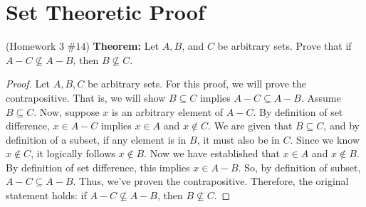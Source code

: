 \documentclass[12pt]{amsart}
\begin{document}
\section{Set Theoretic Proof}
{(Homework 3 $\#14$) }
\textbf{Theorem:}{ Let $A, B$, and $C$ be arbitrary sets. Prove that if $A-C \nsubseteq A-B$, then $B \nsubseteq C$.}
\begin{proof}
Let $A, B, C$ be arbitrary sets. For this proof, we will prove the contrapositive. That is, we will show $B \subseteq C$ implies $A-C \subseteq A-B$. Assume $B \subseteq C$. Now, suppose $x$ is an arbitrary element of $A - C$. By definition of set difference, $x \in A - C$ implies $x \in A$ and $x \not \in C$. We are given that $B \subseteq C$, and by definition of a subset, if any element is in $B$, it must also be in $C$. Since we know $x \notin C$, it logically follows $x \notin B$.
Now we have established that $x \in A$ and $x \notin B$. By definition of set difference, this implies $x \in A - B$. So, by definition of subset, $A - C \subseteq A - B$. Thus, we've proven the contrapositive. Therefore, the original statement holds: if $A - C \not\subseteq A - B$, then $ B \not\subseteq C$.
\end{proof}
\end{document}
